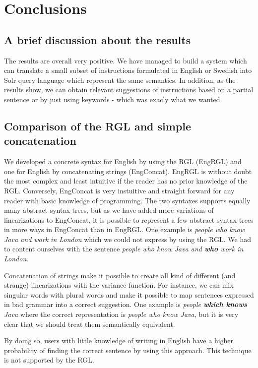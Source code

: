 \chapter{Conclusions}\label{ch:conclusion}
\section{A brief discussion about the results}
The results are overall very positive. We have managed to build a system which can translate a small subset of instructions formulated in English or Swedish into Solr query language which represent the same semantics. In addition, as the results show, we can obtain relevant suggestions of instructions based on a partial sentence or by just using keywords - which was exacly what we wanted.

\section{Comparison of the RGL and simple concatenation}\label{sec:comparison}
We developed a concrete syntax for English by using the RGL (EngRGL) and one for English by concatenating strings (EngConcat). EngRGL is without doubt the most complex and least intuitive if the reader has no prior knowledge of the RGL. Conversely, EngConcat is very instuitive and straight forward for any reader with basic knowledge of programming. The two syntaxes supports equally many abstract syntax trees, but as we have added more variations of linearizations to EngConcat, it is possible to represent a few abstract syntax trees in more ways in EngConcat than in EngRGL. One example is \emph{people who know Java and work in London} which we could not express by using the RGL. We had to content  ourselves with the sentence \emph{people who know Java and \textbf{who} work in London}.

Concatenation of strings make it possible to create all kind of different (and strange) linearizations with the variance function. For instance, we can mix singular words with plural words and make it possible to map sentences expressed in bad grammar into a correct suggestion. One example is \emph{people \textbf{which knows} Java} where the correct representation is \emph{people who know Java}, but it is very clear that we should treat them semantically equivalent.

By doing so, users with little knowledge of writing in English have a higher probability of finding the correct sentence by using this approach. This technique is not supported by the RGL.

